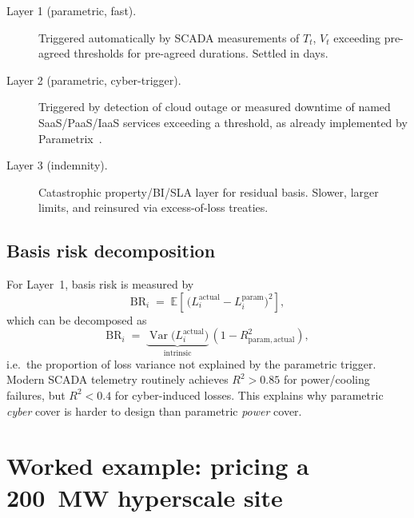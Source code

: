 \documentclass[11pt,a4paper]{article}
\let\origsection\section
\renewcommand{\section}{\clearpage\origsection}
\theoremstyle{ia}
\newcommand{\E}{\mathbb{E}}
\newcommand{\Var}{\operatorname{Var}}
\newcommand{\1}{\mathbf{1}}
\begin{document}
\smallskip
\begin{tcolorbox}[colback=blue!4,colframe=blue!55!black,title=Hybrid product]
\begin{description}
  \item[Layer 1 (parametric, fast).] Triggered automatically by SCADA
        measurements of $T_t$, $V_t$ exceeding pre-agreed thresholds
        for pre-agreed durations. Settled in days.
  \item[Layer 2 (parametric, cyber-trigger).] Triggered by detection
        of cloud outage or measured downtime of named SaaS/PaaS/IaaS
        services exceeding a threshold, as already implemented by
        Parametrix~\citep{Parametrix2022}.
  \item[Layer 3 (indemnity).] Catastrophic property/BI/SLA layer for
        residual basis. Slower, larger limits, and reinsured via
        excess-of-loss treaties.
\end{description}
\end{tcolorbox}

\subsection{Basis risk decomposition}

For Layer~1, basis risk is measured by
\begin{equation}\label{eq:basis}
   \mathrm{BR}_i \;=\;
   \E\!\left[\,\bigl(L^{\mathrm{actual}}_i - L^{\mathrm{param}}_i\bigr)^2\right],
\end{equation}
which can be decomposed as
\begin{equation}\label{eq:basis2}
   \mathrm{BR}_i \;=\;
   \underbrace{\Var\bigl(L^{\mathrm{actual}}_i\bigr)}_{\text{intrinsic}}
   \,(1-R^2_{\mathrm{param},\mathrm{actual}}),
\end{equation}
i.e.\ the proportion of loss variance not explained by the parametric
trigger. Modern SCADA telemetry routinely achieves $R^2 > 0.85$ for
power/cooling failures, but $R^2 < 0.4$ for cyber-induced losses.
This explains why parametric \emph{cyber} cover is harder to design
than parametric \emph{power} cover.

\section{Worked example: pricing a 200~MW hyperscale site}\label{sec:example}
\end{document}
